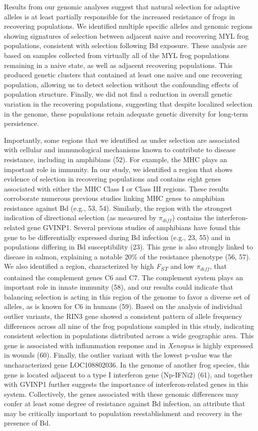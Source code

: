 \documentclass[9pt,twocolumn,twoside,lineno]{pnas-new}
\begin{document}
Results from our genomic analyses suggest that natural selection for
adaptive alleles is at least partially responsible for the increased
resistance of frogs in recovering populations. We identified multiple
specific alleles and genomic regions showing signatures of selection
between adjacent naive and recovering MYL frog populations, consistent
with selection following Bd exposure. These analysis are based on
samples collected from virtually all of the MYL frog populations
remaining in a naive state, as well as adjacent recovering populations.
This produced genetic clusters that contained at least one naive and one
recovering population, allowing us to detect selection without the
confounding effects of population structure. Finally, we did not find a
reduction in overall genetic variation in the recovering populations,
suggesting that despite localized selection in the genome, these
populations retain adequate genetic diversity for long-term persistence.

Importantly, some regions that we identified as under selection are
associated with cellular and immunological mechanisms known to
contribute to disease resistance, including in amphibians (52). For
example, the MHC plays an important role in immunity. In our study, we
identified a region that shows evidence of selection in recovering
populations and contains eight genes associated with either the MHC
Class I or Class III regions. These results corroborate numerous
previous studies linking MHC genes to amphibian resistance against Bd
(e.g., 53, 54). Similarly, the region with the strongest indication of
directional selection (as measured by \(\pi_{diff}\)) contains the
interferon-related gene GVINP1. Several previous studies of amphibians
have found this gene to be differentially expressed during Bd infection
(e.g., 23, 55) and in populations differing in Bd susceptibility (23).
This gene is also strongly linked to disease in salmon, explaining a
notable 20\% of the resistance phenotype (56, 57). We also identified a
region, characterized by high \emph{F\textsubscript{ST}} and low
\(\pi_{diff}\), that contained the complement genes C6 and C7. The
complement system plays an important role in innate immunity (58), and
our results could indicate that balancing selection is acting in this
region of the genome to favor a diverse set of alleles, as is known for
C6 in humans (59). Based on the analysis of individual outlier variants,
the RIN3 gene showed a consistent pattern of allele frequency
differences across all nine of the frog populations sampled in this
study, indicating consistent selection in populations distributed across
a wide geographic area. This gene is associated with inflammation
response and in \emph{Xenopus} is highly expressed in wounds (60).
Finally, the outlier variant with the lowest p-value was the
uncharacterized gene LOC108802036. In the genome of another frog
species, this gene is located adjacent to a type I interferon gene
(Np-IFNi2) (61), and together with GVINP1 further suggests the
importance of interferon-related genes in this system. Collectively, the
genes associated with these genomic differences may confer at least some
degree of resistance against Bd infection, an attribute that may be
critically important to population reestablishment and recovery in the
presence of Bd.
\end{document}
